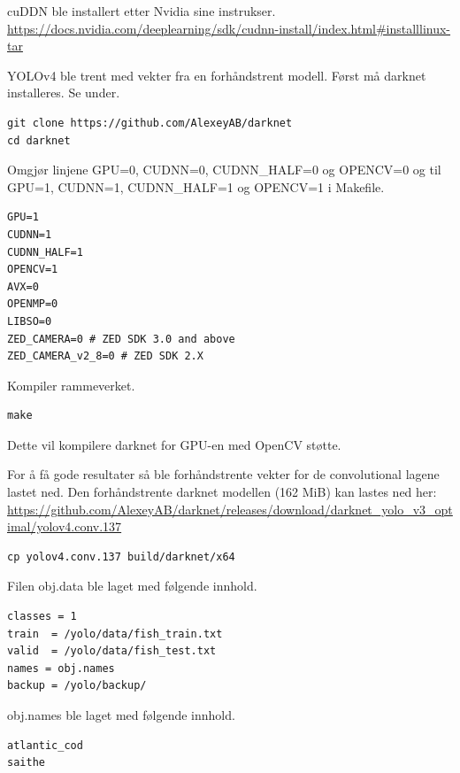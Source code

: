 cuDDN ble installert etter Nvidia sine instrukser. \url{https://docs.nvidia.com/deeplearning/sdk/cudnn-install/index.html#installlinux-tar}

YOLOv4 ble trent med vekter fra en forhåndstrent modell. Først må darknet installeres. Se under.

\begin{verbatim}
git clone https://github.com/AlexeyAB/darknet
cd darknet
\end{verbatim}

Omgjør linjene GPU=0, CUDNN=0, CUDNN\_HALF=0 og OPENCV=0 og til GPU=1, CUDNN=1, CUDNN\_HALF=1 og OPENCV=1 i Makefile.

\begin{lstlisting}[language={}, caption=De første linjene i Makefile]
GPU=1
CUDNN=1
CUDNN_HALF=1
OPENCV=1
AVX=0
OPENMP=0
LIBSO=0
ZED_CAMERA=0 # ZED SDK 3.0 and above
ZED_CAMERA_v2_8=0 # ZED SDK 2.X
\end{lstlisting}

Kompiler rammeverket.

\begin{verbatim}
make
\end{verbatim}

Dette vil kompilere darknet for GPU-en med OpenCV støtte.


For å få gode resultater så ble forhåndstrente vekter for de convolutional lagene lastet ned. Den forhåndstrente darknet modellen (162 MiB) kan lastes ned her: \url{https://github.com/AlexeyAB/darknet/releases/download/darknet_yolo_v3_optimal/yolov4.conv.137}

\begin{verbatim}
cp yolov4.conv.137 build/darknet/x64
\end{verbatim}

Filen obj.data ble laget med følgende innhold.

\begin{lstlisting}[language={}, caption=obj.data]
classes = 1
train  = /yolo/data/fish_train.txt
valid  = /yolo/data/fish_test.txt
names = obj.names
backup = /yolo/backup/
\end{lstlisting}

obj.names ble laget med følgende innhold.

\begin{lstlisting}[language={}, caption=obj.names]
atlantic_cod
saithe
\end{lstlisting}

